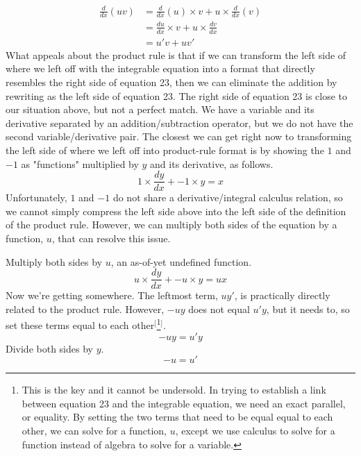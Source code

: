 \documentclass{article}
\begin{document}
\begin{align*}
    \frac{d}{dx}(uv) &= \frac{d}{dx}(u)\times v+u\times \frac{d}{dx}(v)\\
    &= \frac{du}{dx}\times v+u\times \frac{dv}{dx}\tag{23}\\
    &= u'v+uv'
\end{align*}
What appeals about the product rule is that if we can transform the left side of where we left off with the integrable equation into a format that directly resembles the right side of equation 23, then we can eliminate the addition by rewriting as the left side of equation 23. The right side of equation 23 is close to our situation above, but not a perfect match. We have a variable and its derivative separated by an addition/subtraction operator, but we do not have the second variable/derivative pair. The closest we can get right now to transforming the left side of where we left off into product-rule format is by showing the $1$ and $-1$ as "functions" multiplied by $y$ and its derivative, as follows.
\begin{equation*}
    1\times\frac{dy}{dx}+-1\times y=x
\end{equation*}
Unfortunately, $1$ and $-1$ do not share a derivative/integral calculus relation, so we cannot simply compress the left side above into the left side of the definition of the product rule. However, we can multiply both sides of the equation by a function, $u$, that can resolve this issue.\par
Multiply both sides by $u$, an as-of-yet undefined function.
\begin{equation}
    u\times\frac{dy}{dx}+-u\times y=ux
\end{equation}
Now we're getting somewhere. The leftmost term, $uy'$, is practically directly related to the product rule. However, $-uy$ does not equal $u'y$, but it needs to, so set these terms equal to each other$^[$\footnote{This is the key and it cannot be undersold. In trying to establish a link between equation 23 and the integrable equation, we need an exact parallel, or equality. By setting the two terms that need to be equal equal to each other, we can solve for a function, $u$, except we use calculus to solve for a function instead of algebra to solve for a variable.}$^]$.
\begin{equation*}
    -uy=u'y
\end{equation*}
Divide both sides by $y$.
\begin{equation*}
    -u=u'
\end{equation*}
\end{document}
